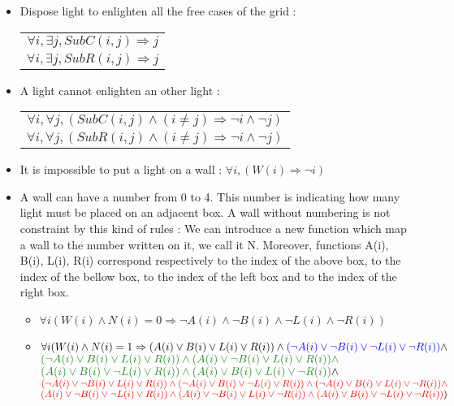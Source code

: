 \documentclass[a4paper]{article}
\begin{document}
\begin{itemize}
\item Dispose light to enlighten all the free cases of the grid :
\begin{tabular}{c}
$ \forall i, \exists j, SubC(i, j) \Rightarrow j $ \\
$ \forall i, \exists j, SubR(i, j) \Rightarrow j $
\end{tabular}

\item A light cannot enlighten an other light :
\begin{tabular}{c}
$ \forall i, \forall j, ( SubC(i, j) \land ( i \neq j) \Rightarrow \neg i \land \neg j ) $ \\
$ \forall i, \forall j, ( SubR(i, j) \land ( i \neq j) \Rightarrow \neg i \land \neg j ) $ \\
\end{tabular}
\item It is impossible to put a light on a wall :
$ \forall i, ( W(i) \Rightarrow \neg i ) $

\item A wall can have a number from 0 to 4. This number is indicating how many light must be placed on an adjacent box. A wall without numbering is not constraint by this kind of rules : \newline
We can introduce a new function which map a wall to the number written on it, we call it N. Moreover, functions A(i), B(i), L(i), R(i) correspond respectively to the index of the above box, to the index of the bellow box, to the index of the left box and to the index of the right box. \newline
\begin{itemize}
\item $ \forall i ( W(i) \land N(i)=0 \Rightarrow  \neg A(i) \land \neg B(i) \land \neg L(i) \land \neg R(i) )$  \\


\item $ \forall i ( W(i) \land N(i)=1 \Rightarrow  ( A(i) \lor B(i) \lor L(i) \lor R(i) ) \land \textcolor{blue}{( \neg A(i) \lor \neg B(i) \lor \neg L(i) \lor \neg R(i))}  \land $ \\
$\textcolor{ForestGreen}{( \neg A(i) \lor B(i) \lor L(i) \lor R(i) ) \land  ( A(i) \lor \neg B(i) \lor L(i) \lor R(i) ) \land }$ \\
$ \textcolor{ForestGreen}{( A(i) \lor B(i) \lor \neg L(i) \lor R(i) ) \land ( A(i) \lor B(i) \lor L(i) \lor \neg R(i) )} \land $ \\
$\textcolor{red}{( \neg A(i) \lor \neg B(i) \lor L(i) \lor R(i)) \land ( \neg A(i) \lor B(i) \lor \neg L(i) \lor R(i) ) \land ( \neg A(i) \lor B(i) \lor L(i) \lor \neg R(i) )\land } $ \\ 
$ \textcolor{red}{ ( A(i) \lor \neg B(i) \lor \neg L(i) \lor R(i) ) \land ( A(i) \lor \neg B(i) \lor L(i) \lor \neg R(i) ) \land ( A(i) \lor B(i) \lor \neg L(i) \lor \neg R(i) ) }) $  \\



\end{itemize}
\end{itemize}
\end{document}
